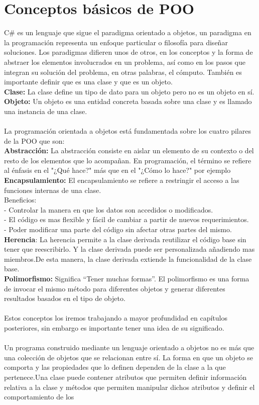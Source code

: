 \documentclass[12pt,a4paper]{report}
\begin{document}
\section{Conceptos básicos de POO}
C\# es un lenguaje que sigue el paradigma orientado a objetos, un paradigma en la programación representa un enfoque particular o filosofía para diseñar soluciones. Los paradigmas difieren unos de otros, en los conceptos y la forma de abstraer los elementos involucrados en un problema, así como en los pasos que integran su solución del problema, en otras palabras, el cómputo. También es importante definir que es una clase y que es un objeto.\\\textbf{Clase: }	La clase define un tipo de dato para un objeto pero no es un objeto en sí.\\\textbf{Objeto: }Un objeto es una entidad concreta basada sobre una clase y es llamado una instancia de una clase.\\\\La programación orientada a objetos está fundamentada sobre los cuatro pilares de la POO que son: \\\textbf{Abstracción: } La abstracción consiste en aislar un elemento de su contexto o del resto de los elementos que lo acompañan. En programación, el término se refiere al énfasis en el "¿Qué hace?" más que en el "¿Cómo lo hace?" por ejemplo \\\textbf{Encapsulamiento: }El encapsulamiento se refiere a restringir el acceso a las funciones internas de una clase.\\Beneficios:\\ - Controlar la manera en que los datos son accedidos o modificados.\\ - El código es mas flexible y fácil de cambiar a partir de nuevos requerimientos.\\ -  Poder modificar una parte del código sin afectar otras partes del mismo.\\\textbf{Herencia}: La herencia permite a la clase derivada reutilizar el código base sin tener que reescribirlo. Y la clase derivada puede ser personalizada añadiendo mas miembros.De esta manera, la clase derivada extiende la funcionalidad de la clase base.\\\textbf{Polimorfismo: }Significa “Tener muchas formas”. El polimorfismo es una forma de invocar el mismo método para diferentes objetos y generar diferentes resultados basados en el tipo de objeto.\\\\Estos conceptos los iremos trabajando a mayor profundidad en capítulos posteriores, sin embargo es importante tener una idea de su significado.\\\\Un programa construido mediante un lenguaje orientado a objetos no es más que una colección de objetos que se relacionan entre sí. La forma en que un objeto se comporta y las propiedades que lo definen dependen de la clase a la que pertenece.Una clase puede contener atributos que permiten definir información relativa a la clase y métodos que permiten manipular dichos atributos y definir el comportamiento de los 
\end{document}
